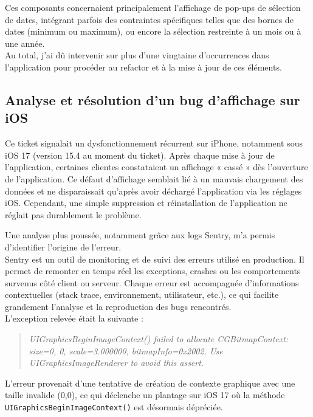 \documentclass{article}
\begin{document}
Ces composants concernaient principalement l'affichage de pop-ups de sélection de dates, intégrant parfois des contraintes spécifiques telles que des bornes de dates (minimum ou maximum), ou encore la sélection restreinte à un mois ou à une année. \\

Au total, j'ai dû intervenir sur plus d'une vingtaine d'occurrences dans l'application pour procéder au refactor et à la mise à jour de ces éléments.

\subsection{ Analyse et résolution d'un bug d'affichage sur iOS}

Ce ticket signalait un dysfonctionnement récurrent sur iPhone, notamment sous iOS 17 (version 15.4 au moment du ticket). Après chaque mise à jour de l'application, certaines clientes constataient un affichage « cassé » dès l'ouverture de l'application. Ce défaut d'affichage semblait lié à un mauvais chargement des données et ne disparaissait qu'après avoir déchargé l'application via les réglages iOS. Cependant, une simple suppression et réinstallation de l'application ne réglait pas durablement le problème.

Une analyse plus poussée, notamment grâce aux logs Sentry, m'a permis d'identifier l'origine de l'erreur. \\

Sentry est un outil de monitoring et de suivi des erreurs utilisé en production. Il permet de remonter en temps réel les exceptions, crashes ou les comportements survenus côté client ou serveur. Chaque erreur est accompagnée d'informations contextuelles (stack trace, environnement, utilisateur, etc.), ce qui facilite grandement l'analyse et la reproduction des bugs rencontrés. \\

L'exception relevée était la suivante :

\begin{quote}
\textit{UIGraphicsBeginImageContext() failed to allocate CGBitmapContext: size={0, 0}, scale=3.000000, bitmapInfo=0x2002. Use UIGraphicsImageRenderer to avoid this assert.}
\end{quote}

L'erreur provenait d'une tentative de création de contexte graphique avec une taille invalide (0,0), ce qui déclenche un plantage sur iOS 17 où la méthode \texttt{UIGraphicsBeginImageContext()} est désormais dépréciée. \\
\end{document}
